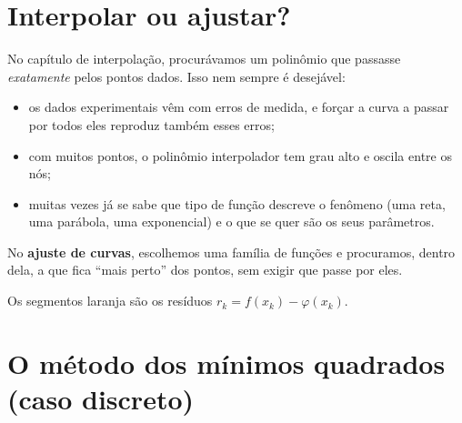 \section{Interpolar ou ajustar?}

No capítulo de interpolação, procurávamos um polinômio que passasse \emph{exatamente} pelos pontos
dados. Isso nem sempre é desejável:
\begin{itemize}[nosep]
  \item os dados experimentais vêm com erros de medida, e forçar a curva a passar por todos eles
        reproduz também esses erros;
  \item com muitos pontos, o polinômio interpolador tem grau alto e oscila entre os nós;
  \item muitas vezes já se sabe que tipo de função descreve o fenômeno (uma reta, uma parábola, uma
        exponencial) e o que se quer são os seus parâmetros.
\end{itemize}

No \textbf{ajuste de curvas}, escolhemos uma família de funções e procuramos, dentro dela, a que
fica ``mais perto'' dos pontos, sem exigir que passe por eles.

\begin{center}

\small Os segmentos laranja são os resíduos $r_k=f(x_k)-\varphi(x_k)$.
\end{center}

\section{O método dos mínimos quadrados (caso discreto)}

